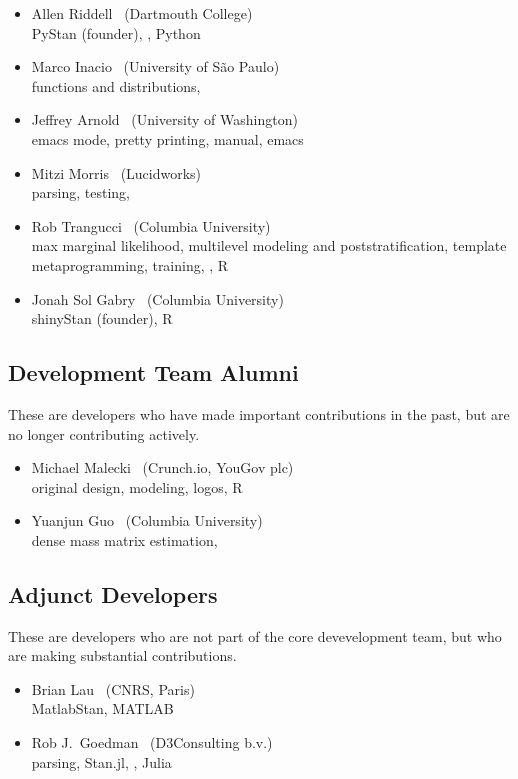 \begin{itemize}
\item Allen Riddell \   (Dartmouth College)
\\ {\footnotesize PyStan (founder), \Cpp, Python}
\item Marco Inacio \   (University of S\~{a}o Paulo)
\\ {\footnotesize functions and distributions, \Cpp}
\item Jeffrey Arnold \   (University of Washington)
\\ {\footnotesize emacs mode, pretty printing, manual, emacs}
\item Mitzi Morris \   (Lucidworks)
\\ {\footnotesize parsing, testing, \Cpp}
\item Rob Trangucci \   (Columbia University)
\\ {\footnotesize max marginal likelihood, multilevel modeling and
  poststratification, template metaprogramming, training, \Cpp, R}
\item Jonah Sol Gabry \ (Columbia University)
\\ {\footnotesize shinyStan (founder), R}
\end{itemize}

\subsection*{Development Team Alumni}

These are developers who have made important contributions in the
past, but are no longer contributing actively.

\begin{itemize}
\item Michael Malecki \ (Crunch.io, YouGov plc)
\\ {\footnotesize original design, modeling, logos, R}
\item Yuanjun Guo \ (Columbia University)
\\ {\footnotesize dense mass matrix estimation, \Cpp}
\end{itemize}

\subsection*{Adjunct Developers}

These are developers who are not part of the core devevelopment team,
but who are making substantial contributions.

\begin{itemize}
\item Brian Lau \ (CNRS, Paris)
\\ {\footnotesize MatlabStan, MATLAB}
\item Rob J.\ Goedman \ (D3Consulting b.v.)
\\ {\footnotesize parsing, Stan.jl, \Cpp, Julia}
\end{itemize}